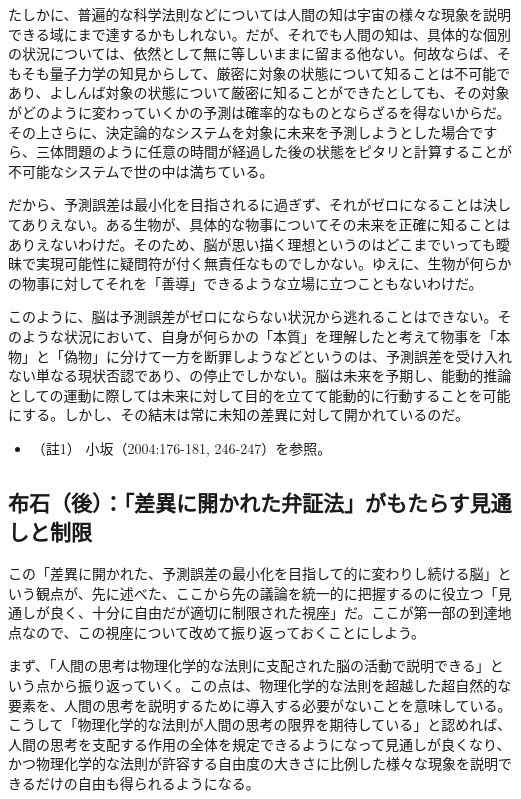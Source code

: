 たしかに、普遍的な科学法則などについては人間の知は宇宙の様々な現象を説明できる域にまで達するかもしれない。だが、それでも人間の知は、具体的な個別の状況については、依然として無に等しいままに留まる他ない。何故ならば、そもそも量子力学の知見からして、厳密に対象の状態について知ることは不可能であり、よしんば対象の状態について厳密に知ることができたとしても、その対象がどのように変わっていくかの予測は確率的なものとならざるを得ないからだ。その上さらに、決定論的なシステムを対象に未来を予測しようとした場合ですら、三体問題のように任意の時間が経過した後の状態をピタリと計算することが不可能なシステムで世の中は満ちている。

だから、予測誤差は最小化を目指されるに過ぎず、それがゼロになることは決してありえない。ある生物が、具体的な物事についてその未来を正確に知ることはありえないわけだ。そのため、脳が思い描く理想というのはどこまでいっても曖昧で実現可能性に疑問符が付く無責任なものでしかない。ゆえに、生物が何らかの物事に対してそれを「善導」できるような立場に立つこともないわけだ。

このように、脳は予測誤差がゼロにならない状況から逃れることはできない。そのような状況において、自身が何らかの「本質」を理解したと考えて物事を「本物」と「偽物」に分けて一方を断罪しようなどというのは、予測誤差を受け入れない単なる現状否認であり、の停止でしかない。脳は未来を予期し、能動的推論としての運動に際しては未来に対して目的を立てて能動的に行動することを可能にする。しかし、その結末は常に未知の差異に対して開かれているのだ。

\begin{itemize}
\tightlist
\item
  （註1） 小坂（2004:176-181, 246-247）\cite{Kosaka}を参照。
\end{itemize}

\subsection{布石（後）：「差異に開かれた弁証法」がもたらす見通しと制限}\label{ux5e03ux77f3ux5f8cux5deeux7570ux306bux958bux304bux308cux305fux5f01ux8a3cux6cd5ux304cux3082ux305fux3089ux3059ux898bux901aux3057ux3068ux5236ux9650}

この「差異に開かれた、予測誤差の最小化を目指して的に変わりし続ける脳」という観点が、先に述べた、ここから先の議論を統一的に把握するのに役立つ「見通しが良く、十分に自由だが適切に制限された視座」だ。ここが第一部の到達地点なので、この視座について改めて振り返っておくことにしよう。

まず、「人間の思考は物理化学的な法則に支配された脳の活動で説明できる」という点から振り返っていく。この点は、物理化学的な法則を超越した超自然的な要素を、人間の思考を説明するために導入する必要がないことを意味している。こうして「物理化学的な法則が人間の思考の限界を期待している」と認めれば、人間の思考を支配する作用の全体を規定できるようになって見通しが良くなり、かつ物理化学的な法則が許容する自由度の大きさに比例した様々な現象を説明できるだけの自由も得られるようになる。

